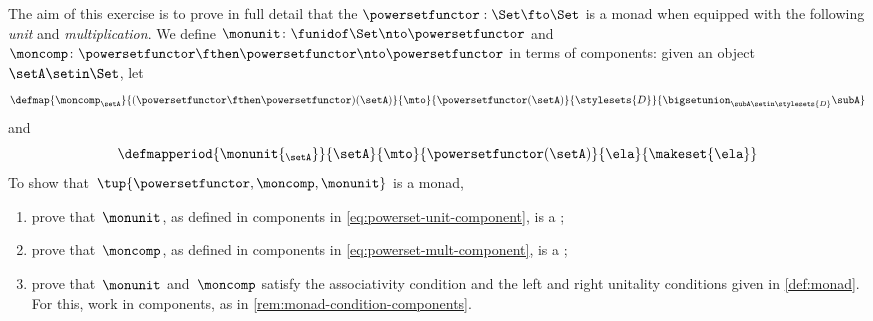 \begin{gradedexercise}
    \label{ex:PowersetMonad}
    The aim of this exercise is to prove in full detail that the   $\powersetfunctor : \Set \fto \Set$ is a monad when equipped with the following \emph{unit} and \emph{multiplication}.
    We define $\monunit \colon \funidof\Set \nto \powersetfunctor$ and $\moncomp \colon \powersetfunctor \fthen \powersetfunctor \nto \powersetfunctor$ in terms of components: given an object $\setA \setin \Set$, let
    \begin{equation}
        \defmap{\moncomp_{\setA}}{(\powersetfunctor \fthen \powersetfunctor)(\setA)}{\mto}{\powersetfunctor(\setA)}{\stylesets{D}}{\bigsetunion_{\subA \setin \stylesets{D}} \subA}
    \end{equation}
    and
    \begin{equation}
        \defmapperiod{\monunit{_\setA}}{\setA}{\mto}{\powersetfunctor(\setA)}{\ela}{\makeset{ \ela }}
    \end{equation}
    To show that~$\tup{\powersetfunctor, \moncomp, \monunit}$ is a monad,
    \begin{enumerate}
        \item prove that~$\monunit$, as defined in components in \cref{eq:powerset-unit-component}, is a ;
        \item prove that~$\moncomp$, as defined in components in \cref{eq:powerset-mult-component}, is a ;
        \item prove that~$\monunit$ and~$\moncomp$ satisfy the associativity condition and the left and right unitality conditions given in \cref{def:monad}.
              For this, work in components, as in \cref{rem:monad-condition-components}.
    \end{enumerate}
\end{gradedexercise}

